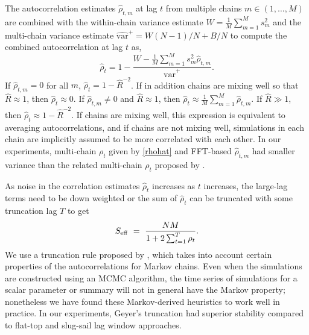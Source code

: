 \documentclass[american,]{article}
\theoremstyle{definition}
\begin{document}
The autocorrelation estimates \(\hat{\rho}_{t,m}\) at lag \(t\) from
multiple chains \(m \in (1,\ldots,M)\) are combined with the
within-chain variance estimate \(W= \frac{1}{M}\sum_{m=1}^{M}s_m^2\)
and the multi-chain variance estimate
\(\widehat{\mbox{var}}^{+} = W(N-1)/N+B/N\) to compute the combined
autocorrelation at lag \(t\) as,
\begin{equation}
\hat{\rho}_t
= 1 - \frac{\displaystyle W - \textstyle \frac{1}{M} \sum_{m=1}^M
s_m^2 \hat{\rho}_{t,m}}{\widehat{\mbox{var}}^{+}}. \label{rhohat}
\end{equation}
If $\hat{\rho}_{t,m}=0$ for all $m$, $\hat{\rho}_t=1-\widehat{R}^{-2}$.
If in addition chains are mixing well so that
$\widehat{R}\approx 1$, then $\hat{\rho}_t \approx 0$. If
$\hat{\rho}_{t,m} \neq 0$ and $\widehat{R} \approx 1$, then
$\hat{\rho}_t \approx \frac{1}{M} \sum_{m=1}^M \hat{\rho}_{t,m}$. If
$\widehat{R} \gg 1$, then $\hat{\rho}_t \approx 1-\widehat{R}^{-2}$.
If chains are mixing well, this expression is equivalent to averaging autocorrelations, and if
chains are not mixing well, simulations in each chain are implicitly assumed to be
more correlated with each other.
%
In our experiments, multi-chain $\rho_t$ given by \eqref{rhohat} and FFT-based $\hat{\rho}_{t,m}$ had smaller variance than the related
multi-chain $\rho_t$ proposed by \citet{BDA3}.

As noise in the correlation estimates \(\hat{\rho}_t\) increases as
\(t\) increases, the large-lag terms need to be down weighted
\citep[lag window approach, see,
e.g.][]{Geyer:1992,Flegal+Jones:2010} or the sum of
\(\hat{\rho}_t\) can be truncated with some truncation lag $T$ to get
\begin{equation}
S_{\rm eff} \ = \ \frac{NM}{1 + 2 \sum_{t = 1}^{T} \rho_t}.
\end{equation}
%
We use a truncation rule proposed by \citet{Geyer:1992}, which takes
into account certain properties of the autocorrelations for Markov
chains.  Even when the simulations are constructed using an MCMC
algorithm, the time series of simulations for a scalar parameter or
summary will not in general have the Markov property; nonetheless we
have found these Markov-derived heuristics to work well in practice.
In our experiments, Geyer's truncation had superior stability
compared to flat-top \citep[e.g.][]{Doss+etal:2014:MCMC-quantiles} and
slug-sail \citep{vats2018revisiting} lag window approaches.
\end{document}
